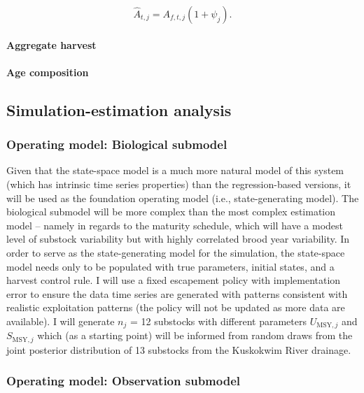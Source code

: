 \documentclass[12pt,]{book}
\let\oldparagraph\paragraph
\renewcommand{\paragraph}[1]{\oldparagraph{#1}\mbox{}}
\theoremstyle{definition}
\theoremstyle{definition}
\theoremstyle{definition}
\theoremstyle{remark}
\begin{document}
\begin{equation}
  \hat{A}_{t,j}=A_{f,t,j}(1 + \psi_j).
  \label{eq:air-expand-final}
\end{equation}

\paragraph{Aggregate harvest}\label{aggregate-harvest}

\paragraph{Age composition}\label{age-composition}

\subsection{Simulation-estimation
analysis}\label{simulation-estimation-analysis}

\subsubsection{Operating model: Biological
submodel}\label{operating-model-biological-submodel}

Given that the state-space model is a much more natural model of this
system (which has intrinsic time series properties) than the
regression-based versions, it will be used as the foundation operating
model (i.e., state-generating model). The biological submodel will be
more complex than the most complex estimation model -- namely in regards
to the maturity schedule, which will have a modest level of substock
variability but with highly correlated brood year variability. In order
to serve as the state-generating model for the simulation, the
state-space model needs only to be populated with true parameters,
initial states, and a harvest control rule. I will use a fixed
escapement policy with implementation error to ensure the data time
series are generated with patterns consistent with realistic
exploitation patterns (the policy will not be updated as more data are
available). I will generate \(n_j\) = 12 substocks with different
parameters \(U_{\text{MSY},j}\) and \(S_{\text{MSY},j}\) which (as a
starting point) will be informed from random draws from the joint
posterior distribution of 13 substocks from the Kuskokwim River
drainage.

\subsubsection{Operating model: Observation
submodel}\label{operating-model-observation-submodel}
\end{document}
